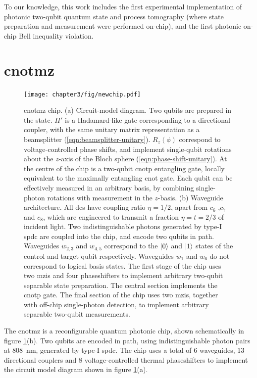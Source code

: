 To our knowledge, this work includes the first experimental implementation of photonic two-qubit quantum state and process tomography (where state preparation and measurement were performed on-chip), and the first photonic on-chip Bell inequality violation.

\section{\acrshort{cnotmz}}

\begin{figure}[t!]
\centering
\texttt{[image: chapter3/fig/newchip.pdf]}
\caption[\acrshort{cnotmz} chip]
{\acrshort{cnotmz} chip. (a) Circuit-model diagram. Two qubits are prepared in the  state. $H'$ is a Hadamard-like gate corresponding to a directional coupler, with the same unitary matrix representation as a beamsplitter (\ref{eqn:beamsplitter-unitary}). $R_z(\phi)$ correspond to voltage-controlled phase shifts, and implement single-qubit rotations about the $z$-axis of the Bloch sphere (\ref{eqn:phase-shift-unitary}). At the centre of the chip is a two-qubit \acrshort{cnotp} entangling gate, locally equivalent to the maximally entangling \acrshort{cnot} gate. Each qubit can be effectively measured in an arbitrary basis, by combining single-photon rotations with measurement in the $z$-basis. (b) Waveguide architecture. All \glspl{dc} have coupling ratio $\eta=1/2$, apart from $c_6$ ,$c_7$ and $c_8$, which are engineered to transmit a fraction $\eta=t=2/3$ of incident light. 
Two indistinguishable photons generated by type-I \gls{spdc} are coupled into the chip, and encode two qubits in path. Waveguides $w_{2,3}$ and $w_{4,5}$ correspond to the $\mbox{$ | 0 \rangle $}$ and $\mbox{$ | 1 \rangle $}$ states of the control and target qubit respectively. Waveguides $w_1$ and $w_6$ do not correspond to logical basis states. The first stage of the chip uses two \glspl{mzi} and four phaseshifters to implement arbitrary two-qubit separable state preparation. The central section implements the \acrshort{cnotp} gate. The final section of the chip uses two \glspl{mzi}, together with off-chip single-photon detection, to implement arbitrary separable two-qubit measurements. }
\label{fig:cnot-mz-chip}
\end{figure}

The \acrshort{cnotmz} is a reconfigurable quantum photonic chip, shown schematically in figure \ref{fig:cnot-mz-chip}(b). Two qubits are encoded in path, using indistinguishable photon pairs at \SI{808}{\nano \metre}, generated by type-I \acrshort{spdc}. The chip uses a total of 6 waveguides, 13 directional couplers and 8 voltage-controlled thermal phaseshifters to implement the circuit model diagram shown in figure \ref{fig:cnot-mz-chip}(a). 

